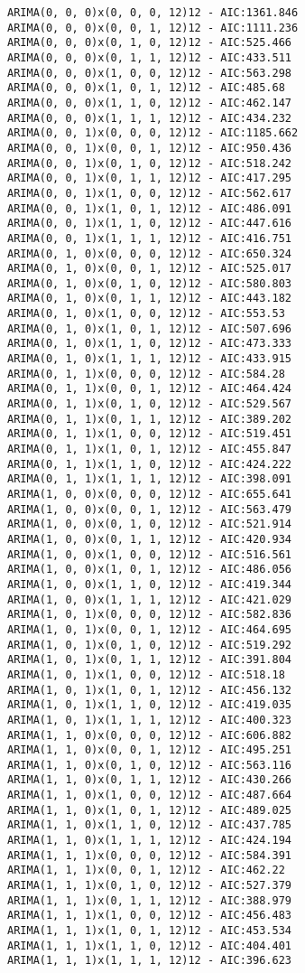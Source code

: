 \documentclass[11pt]{article}
\begin{document}
    \begin{Verbatim}[commandchars=\\\{\}]
ARIMA(0, 0, 0)x(0, 0, 0, 12)12 - AIC:1361.846
ARIMA(0, 0, 0)x(0, 0, 1, 12)12 - AIC:1111.236
ARIMA(0, 0, 0)x(0, 1, 0, 12)12 - AIC:525.466
ARIMA(0, 0, 0)x(0, 1, 1, 12)12 - AIC:433.511
ARIMA(0, 0, 0)x(1, 0, 0, 12)12 - AIC:563.298
ARIMA(0, 0, 0)x(1, 0, 1, 12)12 - AIC:485.68
ARIMA(0, 0, 0)x(1, 1, 0, 12)12 - AIC:462.147
ARIMA(0, 0, 0)x(1, 1, 1, 12)12 - AIC:434.232
ARIMA(0, 0, 1)x(0, 0, 0, 12)12 - AIC:1185.662
ARIMA(0, 0, 1)x(0, 0, 1, 12)12 - AIC:950.436
ARIMA(0, 0, 1)x(0, 1, 0, 12)12 - AIC:518.242
ARIMA(0, 0, 1)x(0, 1, 1, 12)12 - AIC:417.295
ARIMA(0, 0, 1)x(1, 0, 0, 12)12 - AIC:562.617
ARIMA(0, 0, 1)x(1, 0, 1, 12)12 - AIC:486.091
ARIMA(0, 0, 1)x(1, 1, 0, 12)12 - AIC:447.616
ARIMA(0, 0, 1)x(1, 1, 1, 12)12 - AIC:416.751
ARIMA(0, 1, 0)x(0, 0, 0, 12)12 - AIC:650.324
ARIMA(0, 1, 0)x(0, 0, 1, 12)12 - AIC:525.017
ARIMA(0, 1, 0)x(0, 1, 0, 12)12 - AIC:580.803
ARIMA(0, 1, 0)x(0, 1, 1, 12)12 - AIC:443.182
ARIMA(0, 1, 0)x(1, 0, 0, 12)12 - AIC:553.53
ARIMA(0, 1, 0)x(1, 0, 1, 12)12 - AIC:507.696
ARIMA(0, 1, 0)x(1, 1, 0, 12)12 - AIC:473.333
ARIMA(0, 1, 0)x(1, 1, 1, 12)12 - AIC:433.915
ARIMA(0, 1, 1)x(0, 0, 0, 12)12 - AIC:584.28
ARIMA(0, 1, 1)x(0, 0, 1, 12)12 - AIC:464.424
ARIMA(0, 1, 1)x(0, 1, 0, 12)12 - AIC:529.567
ARIMA(0, 1, 1)x(0, 1, 1, 12)12 - AIC:389.202
ARIMA(0, 1, 1)x(1, 0, 0, 12)12 - AIC:519.451
ARIMA(0, 1, 1)x(1, 0, 1, 12)12 - AIC:455.847
ARIMA(0, 1, 1)x(1, 1, 0, 12)12 - AIC:424.222
ARIMA(0, 1, 1)x(1, 1, 1, 12)12 - AIC:398.091
ARIMA(1, 0, 0)x(0, 0, 0, 12)12 - AIC:655.641
ARIMA(1, 0, 0)x(0, 0, 1, 12)12 - AIC:563.479
ARIMA(1, 0, 0)x(0, 1, 0, 12)12 - AIC:521.914
ARIMA(1, 0, 0)x(0, 1, 1, 12)12 - AIC:420.934
ARIMA(1, 0, 0)x(1, 0, 0, 12)12 - AIC:516.561
ARIMA(1, 0, 0)x(1, 0, 1, 12)12 - AIC:486.056
ARIMA(1, 0, 0)x(1, 1, 0, 12)12 - AIC:419.344
ARIMA(1, 0, 0)x(1, 1, 1, 12)12 - AIC:421.029
ARIMA(1, 0, 1)x(0, 0, 0, 12)12 - AIC:582.836
ARIMA(1, 0, 1)x(0, 0, 1, 12)12 - AIC:464.695
ARIMA(1, 0, 1)x(0, 1, 0, 12)12 - AIC:519.292
ARIMA(1, 0, 1)x(0, 1, 1, 12)12 - AIC:391.804
ARIMA(1, 0, 1)x(1, 0, 0, 12)12 - AIC:518.18
ARIMA(1, 0, 1)x(1, 0, 1, 12)12 - AIC:456.132
ARIMA(1, 0, 1)x(1, 1, 0, 12)12 - AIC:419.035
ARIMA(1, 0, 1)x(1, 1, 1, 12)12 - AIC:400.323
ARIMA(1, 1, 0)x(0, 0, 0, 12)12 - AIC:606.882
ARIMA(1, 1, 0)x(0, 0, 1, 12)12 - AIC:495.251
ARIMA(1, 1, 0)x(0, 1, 0, 12)12 - AIC:563.116
ARIMA(1, 1, 0)x(0, 1, 1, 12)12 - AIC:430.266
ARIMA(1, 1, 0)x(1, 0, 0, 12)12 - AIC:487.664
ARIMA(1, 1, 0)x(1, 0, 1, 12)12 - AIC:489.025
ARIMA(1, 1, 0)x(1, 1, 0, 12)12 - AIC:437.785
ARIMA(1, 1, 0)x(1, 1, 1, 12)12 - AIC:424.194
ARIMA(1, 1, 1)x(0, 0, 0, 12)12 - AIC:584.391
ARIMA(1, 1, 1)x(0, 0, 1, 12)12 - AIC:462.22
ARIMA(1, 1, 1)x(0, 1, 0, 12)12 - AIC:527.379
ARIMA(1, 1, 1)x(0, 1, 1, 12)12 - AIC:388.979
ARIMA(1, 1, 1)x(1, 0, 0, 12)12 - AIC:456.483
ARIMA(1, 1, 1)x(1, 0, 1, 12)12 - AIC:453.534
ARIMA(1, 1, 1)x(1, 1, 0, 12)12 - AIC:404.401
ARIMA(1, 1, 1)x(1, 1, 1, 12)12 - AIC:396.623

    \end{Verbatim}
\end{document}
